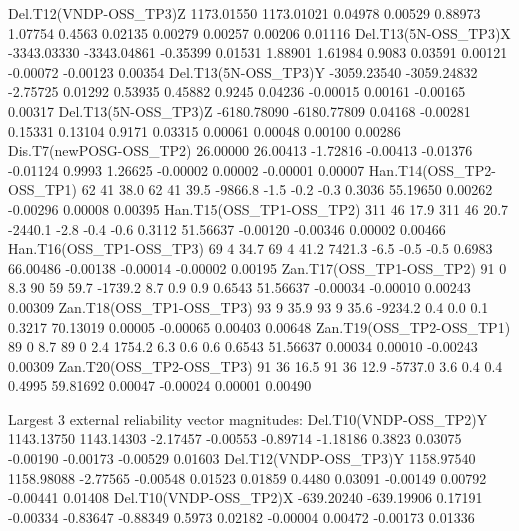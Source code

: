 \begin{landscape}
\begin{Snippet}
 Del.T12(VNDP-OSS_TP3)Z    1173.01550   1173.01021      0.04978       0.00529   0.88973   1.07754  0.4563        0.02135      0.00279      0.00257      0.00206     0.01116
 Del.T13(5N-OSS_TP3)X     -3343.03330  -3343.04861     -0.35399       0.01531   1.88901   1.61984  0.9083        0.03591      0.00121     -0.00072     -0.00123     0.00354
 Del.T13(5N-OSS_TP3)Y     -3059.23540  -3059.24832     -2.75725       0.01292   0.53935   0.45882  0.9245        0.04236     -0.00015      0.00161     -0.00165     0.00317
 Del.T13(5N-OSS_TP3)Z     -6180.78090  -6180.77809      0.04168      -0.00281   0.15331   0.13104  0.9171        0.03315      0.00061      0.00048      0.00100     0.00286
 Dis.T7(newPOSG-OSS_TP2)     26.00000     26.00413     -1.72816      -0.00413  -0.01376  -0.01124  0.9993        1.26625     -0.00002      0.00002     -0.00001     0.00007
 Han.T14(OSS_TP2-OSS_TP1)  62 41 38.0   62 41 39.5      -9866.8          -1.5      -0.2      -0.3  0.3036       55.19650      0.00262     -0.00296      0.00008     0.00395
 Han.T15(OSS_TP1-OSS_TP2) 311 46 17.9  311 46 20.7      -2440.1          -2.8      -0.4      -0.6  0.3112       51.56637     -0.00120     -0.00346      0.00002     0.00466
 Han.T16(OSS_TP1-OSS_TP3)  69  4 34.7   69  4 41.2       7421.3          -6.5      -0.5      -0.5  0.6983       66.00486     -0.00138     -0.00014     -0.00002     0.00195
 Zan.T17(OSS_TP1-OSS_TP2)  91  0  8.3   90 59 59.7      -1739.2           8.7       0.9       0.9  0.6543       51.56637     -0.00034     -0.00010      0.00243     0.00309
 Zan.T18(OSS_TP1-OSS_TP3)  93  9 35.9   93  9 35.6      -9234.2           0.4       0.0       0.1  0.3217       70.13019      0.00005     -0.00065      0.00403     0.00648
 Zan.T19(OSS_TP2-OSS_TP1)  89  0  8.7   89  0  2.4       1754.2           6.3       0.6       0.6  0.6543       51.56637      0.00034      0.00010     -0.00243     0.00309
 Zan.T20(OSS_TP2-OSS_TP3)  91 36 16.5   91 36 12.9      -5737.0           3.6       0.4       0.4  0.4995       59.81692      0.00047     -0.00024      0.00001     0.00490

 Largest 3 external reliability vector magnitudes:
 Del.T10(VNDP-OSS_TP2)Y    1143.13750   1143.14303     -2.17457      -0.00553  -0.89714  -1.18186  0.3823        0.03075     -0.00190     -0.00173     -0.00529     0.01603
 Del.T12(VNDP-OSS_TP3)Y    1158.97540   1158.98088     -2.77565      -0.00548   0.01523   0.01859  0.4480        0.03091     -0.00149      0.00792     -0.00441     0.01408
 Del.T10(VNDP-OSS_TP2)X    -639.20240   -639.19906      0.17191      -0.00334  -0.83647  -0.88349  0.5973        0.02182     -0.00004      0.00472     -0.00173     0.01336


\end{Snippet}
\end{landscape}
